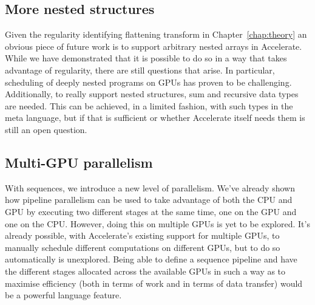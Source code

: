 
\subsection{More nested structures}

Given the regularity identifying flattening transform in Chapter~\ref{chap:theory} an obvious piece of future work is to support arbitrary nested arrays in Accelerate. While we have demonstrated that it is possible to do so in a way that takes advantage of regularity, there are still questions that arise. In particular, scheduling of deeply nested programs on GPUs has proven to be challenging\cite{bergstrom:ndp2gpu}. Additionally, to really support nested structures, sum and recursive data types are needed. This can be achieved, in a limited fashion, with such types in the meta language, but if that is sufficient or whether Accelerate itself needs them is still an open question.

\subsection{Multi-GPU parallelism}

With sequences, we introduce a new level of parallelism. We've already shown how pipeline parallelism can be used to take advantage of both the CPU and GPU by executing two different stages at the same time, one on the GPU and one on the CPU. However, doing this on multiple GPUs is yet to be explored. It's already possible, with Accelerate's existing support for multiple GPUs, to manually schedule different computations on different GPUs, but to do so automatically is unexplored. Being able to define a sequence pipeline and have the different stages allocated across the available GPUs in such a way as to maximise efficiency (both in terms of work and in terms of data transfer) would be a powerful language feature.